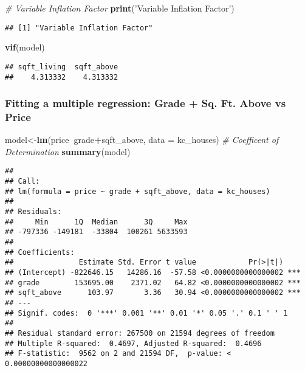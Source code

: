 \documentclass[]{article}
\newenvironment{Shaded}{\begin{snugshade}}{\end{snugshade}}
\newcommand{\CommentTok}[1]{\textcolor[rgb]{0.56,0.35,0.01}{\textit{#1}}}
\newcommand{\DataTypeTok}[1]{\textcolor[rgb]{0.13,0.29,0.53}{#1}}
\newcommand{\KeywordTok}[1]{\textcolor[rgb]{0.13,0.29,0.53}{\textbf{#1}}}
\newcommand{\NormalTok}[1]{#1}
\newcommand{\OperatorTok}[1]{\textcolor[rgb]{0.81,0.36,0.00}{\textbf{#1}}}
\newcommand{\StringTok}[1]{\textcolor[rgb]{0.31,0.60,0.02}{#1}}
\begin{document}
\begin{Shaded}
\begin{Highlighting}[]
\CommentTok{# Variable Inflation Factor}
\KeywordTok{print}\NormalTok{(}\StringTok{'Variable Inflation Factor'}\NormalTok{)}
\end{Highlighting}
\end{Shaded}

\begin{verbatim}
## [1] "Variable Inflation Factor"
\end{verbatim}

\begin{Shaded}
\begin{Highlighting}[]
\KeywordTok{vif}\NormalTok{(model)}
\end{Highlighting}
\end{Shaded}

\begin{verbatim}
## sqft_living  sqft_above 
##    4.313332    4.313332
\end{verbatim}

\hypertarget{fitting-a-multiple-regression-grade-sq.-ft.-above-vs-price}{%
\subsubsection{Fitting a multiple regression: Grade + Sq. Ft. Above vs
Price}\label{fitting-a-multiple-regression-grade-sq.-ft.-above-vs-price}}

\begin{Shaded}
\begin{Highlighting}[]
\NormalTok{model<-}\KeywordTok{lm}\NormalTok{(price}\OperatorTok{~}\NormalTok{grade}\OperatorTok{+}\NormalTok{sqft_above, }\DataTypeTok{data =}\NormalTok{ kc_houses)}
\CommentTok{# Coefficent of Determination}
\KeywordTok{summary}\NormalTok{(model)}
\end{Highlighting}
\end{Shaded}

\begin{verbatim}
## 
## Call:
## lm(formula = price ~ grade + sqft_above, data = kc_houses)
## 
## Residuals:
##     Min      1Q  Median      3Q     Max 
## -797336 -149181  -33804  100261 5633593 
## 
## Coefficients:
##               Estimate Std. Error t value            Pr(>|t|)    
## (Intercept) -822646.15   14286.16  -57.58 <0.0000000000000002 ***
## grade        153695.00    2371.02   64.82 <0.0000000000000002 ***
## sqft_above      103.97       3.36   30.94 <0.0000000000000002 ***
## ---
## Signif. codes:  0 '***' 0.001 '**' 0.01 '*' 0.05 '.' 0.1 ' ' 1
## 
## Residual standard error: 267500 on 21594 degrees of freedom
## Multiple R-squared:  0.4697, Adjusted R-squared:  0.4696 
## F-statistic:  9562 on 2 and 21594 DF,  p-value: < 0.00000000000000022
\end{verbatim}
\end{document}
